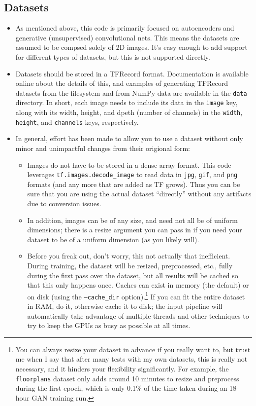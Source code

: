 \documentclass{article}
\begin{document}
\begin{flushleft}
  \section{Datasets}
  \begin{itemize}
  \item As mentioned above, this code is primarily focused on autoencoders and generative (unsupervised) convolutional nets. This means the datasets are assumed to be compsed solely of 2D images. It's easy enough to add support for different types of datasets, but this is not supported directly.
  \item Datasets should be stored in a TFRecord format. Documentation is available online about the details of this, and examples of generating TFRecord datasets from the filesystem and from NumPy data are available in the \texttt{data} directory. In short, each image needs to include its data in the \texttt{image} key, along with its width, height, and dpeth (number of channels) in the \texttt{width}, \texttt{height}, and \texttt{channels} keys, respectively. 
  \item In general, effort has been made to allow you to use a dataset without only minor and unimpactful changes from their origional form:
    \begin{itemize}
  \item Images do not have to be stored in a dense array format. This code leverages \texttt{tf.images.decode\_image} to read data in \texttt{jpg}, \texttt{gif}, and \texttt{png} formats (and any more that are added as TF grows). Thus you can be sure that you are using the actual dataset ``directly'' without any artifacts due to conversion issues. 
  \item In addition, images can be of any size, and need not all be of uniform dimensions; there is a resize argument you can pass in if you need your dataset to be of a uniform dimension (as you likely will).
  \item Before you freak out, don't worry, this not actually that inefficient. During training, the dataset will be resized, preprocessed, etc., fully during the first pass over the dataset, but all results will be cached so that this only happens once. Caches can exist in memory (the default) or on disk (using the \texttt{--cache\_dir} option).\footnote{You can always resize your dataset in advance if you really want to, but trust me when I say that after many tests with my own datasets, this is really not necessary, and it hinders your flexibility significantly. For example, the \texttt{floorplans} dataset only adds around 10 minutes to resize and preprocess during the first epoch, which is only 0.1\% of the time taken during an 18-hour GAN training run.} If you can fit the entire dataset in RAM, do it, otherwise cache it to disk; the input pipeline will automatically take advantage of multiple threads and other techniques to try to keep the GPUs as busy as possible at all times. 
    \end{itemize}
  \end{itemize}




\end{flushleft}
\end{document}
